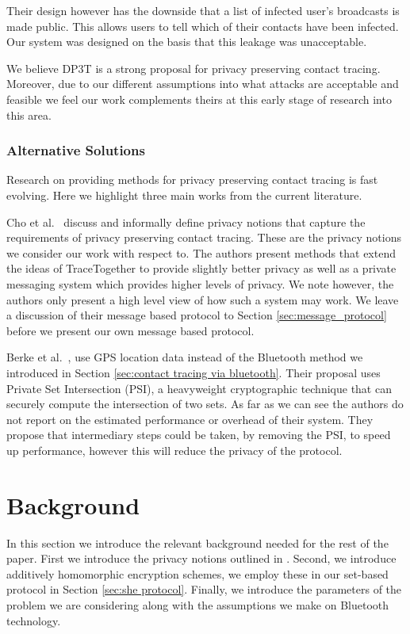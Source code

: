 \documentclass{article}
\begin{document}
Their design however has the downside that a list of infected user's broadcasts is made public. This allows users to tell which of their contacts have been infected. Our system was designed on the basis that this leakage was unacceptable.

We believe DP3T is a strong proposal for privacy preserving contact tracing. Moreover, due to our different assumptions into what attacks are acceptable and feasible we feel our work complements theirs at this early stage of research into this area. 

\subsubsection{Alternative Solutions}

Research on providing methods for privacy preserving contact tracing is fast evolving. Here we highlight three main works from the current literature.

Cho et al.~\cite{DBLP:journals/corr/abs-2003-11511} discuss and informally define privacy notions that capture the requirements of privacy preserving contact tracing. These are the privacy notions we consider our work with respect to. The  authors present methods that extend the ideas of TraceTogether to provide slightly better privacy as well as a private messaging system which provides higher levels of privacy. We note however, the authors only present a high level view of how such a system may work. We leave a discussion of their message based protocol to Section \ref{sec:message_protocol} before we present our own message based protocol. 

Berke et al.~\cite{DBLP:journals/corr/abs-2003-14412}, use  GPS location data instead of the Bluetooth method we introduced in Section \ref{sec:contact tracing via bluetooth}. Their proposal uses Private Set Intersection (PSI), a heavyweight cryptographic  technique that can securely compute the intersection of two sets. As far as we can see the authors do not report on the estimated performance or overhead of their system. They propose that intermediary steps could be taken, by removing the PSI, to speed up performance, however this will reduce the privacy of the protocol.

\section{Background}

In this section we introduce the relevant background needed for the rest of the paper. First we introduce the privacy notions outlined in \cite{DBLP:journals/corr/abs-2003-11511}. Second, we introduce additively homomorphic encryption schemes, we employ these in our set-based protocol in Section \ref{sec:she protocol}. Finally, we introduce the parameters of the problem we are considering along with the assumptions we make on Bluetooth technology.
\end{document}

